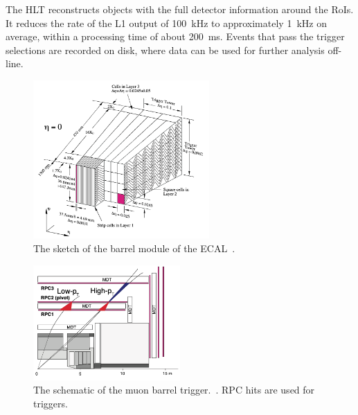 The HLT reconstructs objects with the full detector information around the RoIs. 
It reduces the rate of the L1 output of 100~kHz to approximately 1~kHz on average, within a processing time of about 200~ms.
Events that pass the trigger selections are recorded on disk, where data can be used for further analysis off-line.
\begin{figure}[tbp]
\begin{center}
 \includegraphics[width=0.6\textwidth,keepaspectratio]{figures/detector/TriggerTower}
\caption{
The sketch of the barrel module of the ECAL~\cite{PERF-2007-01}.
}
\label{fig:TriggerTower}
\end{center}
\end{figure}

\begin{figure}[tbp]
\centering
\begin{center}
 \includegraphics[width=0.5\textwidth,keepaspectratio]{figures/detector/muontrigger}
\caption{
The schematic of the muon barrel trigger.~\cite{PERF-2007-01}. RPC hits are used for triggers.
}
\label{fig:muontrigger}
\end{center}
\end{figure}

